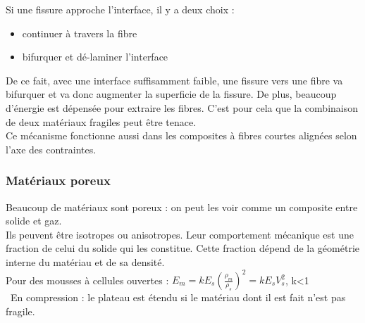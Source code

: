 \documentclass[../main.tex]{subfiles}
\begin{document}
Si une fissure approche l'interface, il y a deux choix :\\
\begin{itemize}
    \item continuer à travers la fibre\\
    \item bifurquer et dé-laminer l'interface\\
\end{itemize}

De ce fait, avec une interface suffisamment faible, une fissure vers une fibre va bifurquer et va donc augmenter la superficie de la fissure. De plus, beaucoup d'énergie est dépensée pour extraire les fibres. C'est pour cela que la combinaison de deux matériaux fragiles peut être tenace. \\
Ce mécanisme fonctionne aussi dans les composites à fibres courtes alignées selon l'axe des contraintes.\\


\subsubsection{Matériaux poreux}
Beaucoup de matériaux sont poreux : on peut les voir comme un composite entre solide et gaz.\\
Ils peuvent être isotropes ou anisotropes. Leur comportement mécanique est une fraction de celui du solide qui les constitue. Cette fraction dépend de la géométrie interne du matériau et de sa densité.\\

Pour des mousses à cellules ouvertes : $E_m = k E_s (\frac{\rho_m}{\rho_s})^2 = k E_s V_s^2$, k<1\\\
En compression : le plateau est étendu si le matériau dont il est fait n'est pas fragile.\\
\end{document}
